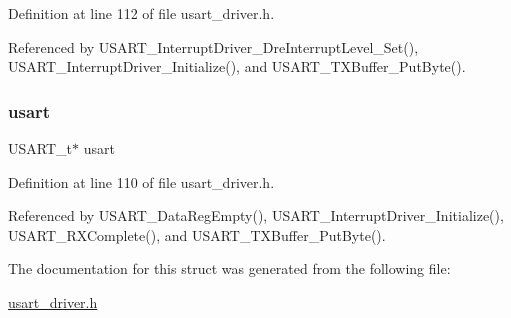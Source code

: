 Definition at line 112 of file usart\+\_\+driver.\+h.



Referenced by U\+S\+A\+R\+T\+\_\+\+Interrupt\+Driver\+\_\+\+Dre\+Interrupt\+Level\+\_\+\+Set(), U\+S\+A\+R\+T\+\_\+\+Interrupt\+Driver\+\_\+\+Initialize(), and U\+S\+A\+R\+T\+\_\+\+T\+X\+Buffer\+\_\+\+Put\+Byte().

\hypertarget{struct_usart__and__buffer_a5a819ee5e46999aaae5cb6813014ec08}{}\label{struct_usart__and__buffer_a5a819ee5e46999aaae5cb6813014ec08} 
\subsubsection{\texorpdfstring{usart}{usart}}
{\footnotesize\ttfamily U\+S\+A\+R\+T\+\_\+t$\ast$ usart}



Definition at line 110 of file usart\+\_\+driver.\+h.



Referenced by U\+S\+A\+R\+T\+\_\+\+Data\+Reg\+Empty(), U\+S\+A\+R\+T\+\_\+\+Interrupt\+Driver\+\_\+\+Initialize(), U\+S\+A\+R\+T\+\_\+\+R\+X\+Complete(), and U\+S\+A\+R\+T\+\_\+\+T\+X\+Buffer\+\_\+\+Put\+Byte().



The documentation for this struct was generated from the following file\+:\begin{DoxyCompactItemize}
\item 
\hyperlink{usart__driver_8h}{usart\+\_\+driver.\+h}\end{DoxyCompactItemize}
